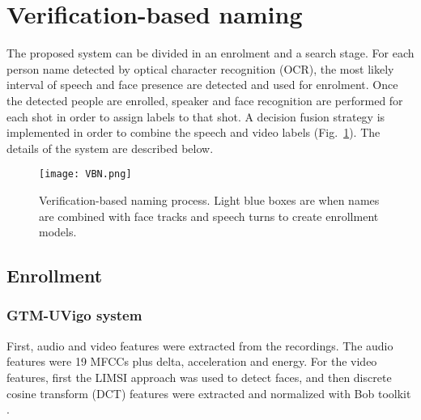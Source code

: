 \section{Verification-based naming}
\label{sec:verification}


The proposed system can be divided in an enrolment and a search stage. For each person name detected by optical character recognition (OCR), the most likely interval
of speech and face presence are detected and used for enrolment.
Once the detected people are enrolled, speaker and face recognition
are performed for each shot in order to assign labels to that shot. 
A decision fusion strategy is implemented in order to combine the speech and video labels (Fig.~\ref{fig:vbn}). The details of the system
are described below.

\begin{figure}[!htb]
 \centering
 \texttt{[image: VBN.png]}
\vspace*{-5mm}
 \caption{Verification-based naming process. Light blue boxes are when names are combined with face tracks and speech turns to create enrollment models.}
\vspace*{-5mm}
 \label{fig:vbn}
\end{figure}

\subsection{Enrollment}

\subsubsection{GTM-UVigo system}
First, audio and video features were extracted from the recordings. The audio features were 19 MFCCs plus delta, acceleration and energy. For the video features, first
the LIMSI approach was used to detect faces, and then discrete cosine transform (DCT) features were extracted and normalized with Bob toolkit \cite{bob2012}.


